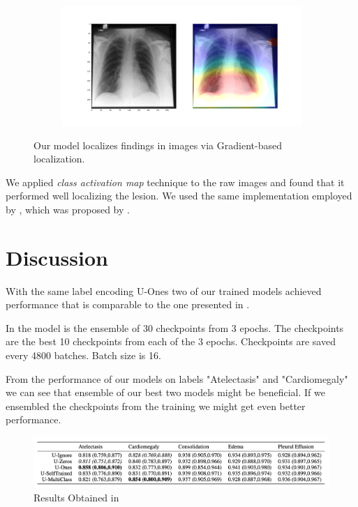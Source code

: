 \documentclass{amia}
\begin{document}
\begin{figure}[ht]
\begin{subfigure}{0.5\linewidth}
	\label{fig:c}
\end{subfigure}
\begin{subfigure}{0.5\linewidth}
	\centering
	\includegraphics[width=\linewidth]{patient64739_1.png}
	\label{fig:d}
\end{subfigure}
\caption{Our model localizes findings in images via Gradient-based localization.}
\end{figure}

We applied \textit{class activation map} technique to the raw images and found that it performed well localizing the lesion. We used the same implementation employed by {\color{cyan}\cite{irvin}}, which was proposed by {\color{cyan}\cite{Selvaraju}}.

\section{Discussion}


With the same label encoding U-Ones two of our trained models achieved performance that is comparable to the one presented in {\color{cyan}\cite{irvin}}.


In {\color{cyan}\cite{irvin}} the model is the ensemble of 30 checkpoints from 3 epochs. The checkpoints are the best 10 checkpoints from each of the 3 epochs. Checkpoints are saved every 4800 batches. Batch size is 16.

From the performance of our models on labels "Atelectasis" and "Cardiomegaly" we can see that ensemble of our best two models might be beneficial. If we ensembled the checkpoints from the training we might get even better performance.

\begin{figure}[h]
	\centering
	\includegraphics[width=1\linewidth]{CheXPert_results.png}
	\caption{Results Obtained in {\color{cyan}\cite{irvin}}}\label{CheXPert_results}
\end{figure}
\end{document}
